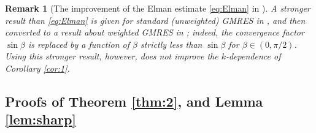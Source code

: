 \documentclass[10pt]{article}%
\newtheorem{remark}[theorem]{Remark}
\numberwithin{equation}{section}
\newcommand{\bre}{\begin{remark}}
\newcommand{\ere}{\end{remark}}
\begin{document}
\bre[The improvement of the Elman estimate \eqref{eq:Elman} in \cite{BeGoTy:06}]
A stronger result than \eqref{eq:Elman} is given for standard (unweighted) GMRES in \cite[Theorem 2.1]{BeGoTy:06}, and then converted to a result about weighted GMRES in \cite[Theorem 5.3]{BoDoGrSpTo:17}; indeed, the convergence factor $\sin \beta$ is replaced by a function of $\beta$ strictly less than $\sin\beta$ for $\beta\in (0,\pi/2)$. Using this stronger result, however, does not improve the $k$-dependence of Corollary \ref{cor:1}.
\ere



\subsection{Proofs of Theorem \ref{thm:2}, and Lemma \ref{lem:sharp}}
\end{document}

